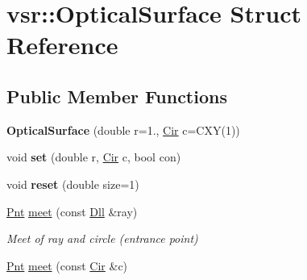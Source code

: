 \hypertarget{structvsr_1_1_optical_surface}{\section{vsr\-:\-:Optical\-Surface Struct Reference}
\label{structvsr_1_1_optical_surface}
}
\subsection*{Public Member Functions}
\begin{DoxyCompactItemize}
\item 
\hypertarget{structvsr_1_1_optical_surface_ac2beedfd3583901669aafa8f1bbaa515}{{\bfseries Optical\-Surface} (double r=1., \hyperlink{namespacevsr_a2744605aa828e495fc85463b7ae0d045}{Cir} c=C\-X\-Y(1))}\label{structvsr_1_1_optical_surface_ac2beedfd3583901669aafa8f1bbaa515}

\item 
\hypertarget{structvsr_1_1_optical_surface_a2edc3a3ff95edddd71087ac47b958e0a}{void {\bfseries set} (double r, \hyperlink{namespacevsr_a2744605aa828e495fc85463b7ae0d045}{Cir} c, bool con)}\label{structvsr_1_1_optical_surface_a2edc3a3ff95edddd71087ac47b958e0a}

\item 
\hypertarget{structvsr_1_1_optical_surface_a1cb71c5d7472ad6c3979a2d27357cab0}{void {\bfseries reset} (double size=1)}\label{structvsr_1_1_optical_surface_a1cb71c5d7472ad6c3979a2d27357cab0}

\item 
\hypertarget{structvsr_1_1_optical_surface_aef029d98858fa93787d1aa23aaf7b31e}{\hyperlink{namespacevsr_a2d05beb9721c5d9211b479af6d47222d}{Pnt} \hyperlink{structvsr_1_1_optical_surface_aef029d98858fa93787d1aa23aaf7b31e}{meet} (const \hyperlink{namespacevsr_a6c6892b7aec25cfb16492501e2e35b11}{Dll} \&ray)}\label{structvsr_1_1_optical_surface_aef029d98858fa93787d1aa23aaf7b31e}

\begin{DoxyCompactList}\small\item\em Meet of ray and circle (entrance point) \end{DoxyCompactList}\item 
\hypertarget{structvsr_1_1_optical_surface_a2f8a8c06a87de9b262032c70aad1d912}{\hyperlink{namespacevsr_a2d05beb9721c5d9211b479af6d47222d}{Pnt} \hyperlink{structvsr_1_1_optical_surface_a2f8a8c06a87de9b262032c70aad1d912}{meet} (const \hyperlink{namespacevsr_a2744605aa828e495fc85463b7ae0d045}{Cir} \&c)}\label{structvsr_1_1_optical_surface_a2f8a8c06a87de9b262032c70aad1d912}


\end{DoxyCompactItemize}
